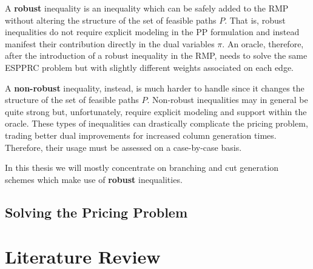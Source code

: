 A \textbf{robust} inequality is an inequality which can be safely added to the RMP without altering the structure of the set of feasible paths $P$.
That is, robust inequalities do not require explicit modeling in the PP formulation and instead manifest their contribution directly in the dual variables $\pi$.
An oracle, therefore, after the introduction of a robust inequality in the RMP, needs to solve the same ESPPRC problem but with slightly different weights associated on each edge.

A \textbf{non-robust} inequality, instead, is much harder to handle since it changes the structure of the set of feasible paths $P$.
Non-robust inequalities may in general be quite strong but, unfortunately, require explicit modeling and support within the oracle.
These types of inequalities can drastically complicate the pricing problem, trading better dual improvements for increased column generation times.
Therefore, their usage must be assessed on a case-by-case basis.


In this thesis we will mostly concentrate on branching and cut generation schemes which make use of \textbf{robust} inequalities.

\subsection{Solving the Pricing Problem}
\label{sec:intro-solving-the-pricing-problem}



\section{Literature Review}
\label{sec:intro-literature-review}

\begin{comment}
\cite{jepsen_branch-and-cut_2011}

Before 1980 very few exact algorithms for cvrp and vrptw had been
proposed, but in the early 1980s two new exact methods where proposed.
From this point the history of exact methods for cvrp and vrptw can
be divided into three phases. The first phase was the introduction of the
Set Partition and the development of Branch-and-Cut-and-Price (bp) algo-
rithms using a relaxed pricing problem. The second was the development of
Branch-and-Cut (bac) algorithms. In the current phase the pricing problem
is no longer relaxed and cuts in the master problem of the Branch-and-Cut-
and-Price algorithms is used. The first two phases where started at the same
point in time and there is still development on the algorithms in the context
of cvrp and vrptw. The algorithms from these two phases are also used
on several other variants of the Vehicle Routing Problem. The third phase
was started in the middle of the 2000s and the algorithms from this phase
are currently the best overall performing algorithms.
\end{comment}

